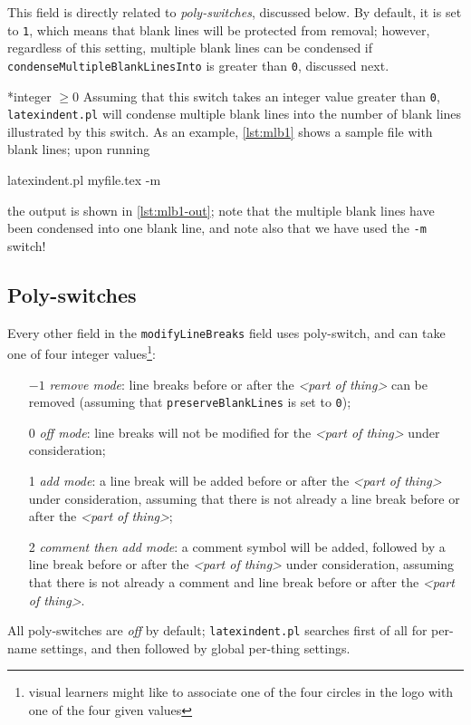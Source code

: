 This field is directly related to \emph{poly-switches}, discussed below. 
By default, it is set to \texttt{1}, which means that blank lines will 
be protected from removal; however, regardless of this setting, multiple 
blank lines can be condensed if \texttt{condenseMultipleBlankLinesInto} is
greater than \texttt{0}, discussed next.

*{integer $\geq 0$}
Assuming that this switch takes an integer value greater than \texttt{0}, \texttt{latexindent.pl} will condense multiple blank lines into
the number of blank lines illustrated by this switch. As an example, \cref{lst:mlb1} shows a sample file 
with blank lines; upon running
\begin{commandshell}
latexindent.pl myfile.tex -m  
\end{commandshell}
the output is shown in \cref{lst:mlb1-out}; note that the multiple blank lines have been 
condensed into one blank line, and note also that we have used the \texttt{-m} switch!

\begin{minipage}{.45\textwidth}
\end{minipage}%
\hfill
\begin{minipage}{.45\textwidth}
\end{minipage}

\subsection{Poly-switches}
Every other field in the \texttt{modifyLineBreaks} field uses poly-switch, and can take
one of four integer values\footnote{visual learners might like to associate one of the four circles in the logo with one of the four given values}:
\begin{itemize}[font=\bfseries]
  \item[$-1$] \emph{remove mode}: line breaks before or after the \emph{<part of thing>} can be removed (assuming that \texttt{preserveBlankLines} is set to \texttt{0});
  \item[0] \emph{off mode}: line breaks will not be modified for the \emph{<part of thing>} under consideration;
  \item[1] \emph{add mode}: a line break will be added before or after the \emph{<part of thing>} under consideration, assuming that
    there is not already a line break before or after the \emph{<part of thing>};
  \item[2] \emph{comment then add mode}: a comment symbol will be added, followed by a line break before or after the \emph{<part of thing>} under consideration, assuming that
    there is not already a comment and line break before or after the \emph{<part of thing>}.
\end{itemize}
All poly-switches are \emph{off} by default; \texttt{latexindent.pl} searches first of all for per-name settings, and then followed by global per-thing settings.


